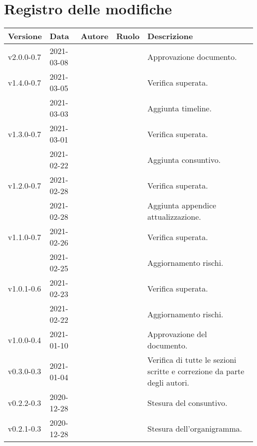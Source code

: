\section*{\hfil Registro delle modifiche \hfil}
{
	\newlength{\freewidth}
	\setlength{\freewidth}{\dimexpr\textwidth-10\tabcolsep}
	\renewcommand{\arraystretch}{1.5}
	\centering
	\setlength{\aboverulesep}{0pt}
	\setlength{\belowrulesep}{0pt}
	\begin{longtable}{C{.131777\freewidth} C{.134036\freewidth} C{.263554\freewidth} C{.188254\freewidth} C{.282379\freewidth}}
		\toprule 
		\textbf{Versione} & \textbf{Data} & \textbf{Autore} & \textbf{Ruolo} & \textbf{Descrizione}\\
		\toprule
		\endhead
		v2.0.0-0.7 & 2021-03-08 & \Matteo{} & \RdP{} & Approvazione documento. \\
		v1.4.0-0.7 & 2021-03-05 & \Davide{} & \ver{} & Verifica superata. \\
		& 2021-03-03 & \Daniele{} & \ana{} & Aggiunta timeline. \\
		v1.3.0-0.7 & 2021-03-01 & \Giosue{} & \ver{} & Verifica superata. \\
		& 2021-02-22 & \Daniele{} & \ana{} & Aggiunta consuntivo. \\
		v1.2.0-0.7 & 2021-02-28 & \Davide{} & \ana{} & Verifica superata. \\
		& 2021-02-28 & \Lucrezia{} & \ana{} & Aggiunta appendice attualizzazione. \\
		v1.1.0-0.7 & 2021-02-26 & \Giosue{} & \ver{} & Verifica superata. \\
		 & 2021-02-25 & \Lucrezia{} & \ana{} & Aggiornamento rischi. \\
		v1.0.1-0.6 & 2021-02-23 & \Davide{} & \ver{} & Verifica superata. \\
		& 2021-02-22 & \Daniele{} & \ana{} & Aggiornamento rischi. \\
		v1.0.0-0.4 & 2021-01-10 & \Daniele{} & \RdP{} & Approvazione del documento. \\
		v0.3.0-0.3 & 2021-01-04 & \Lucrezia{} & \ver{} & Verifica di tutte le sezioni scritte e correzione da parte degli autori. \\

		v0.2.2-0.3 & 2020-12-28 & \Tommaso{} & \ana{} & Stesura del consuntivo. \\
		v0.2.1-0.3 & 2020-12-28 & \Matteo{} & \ana{} & Stesura dell'organigramma. \\


\end{longtable}}
